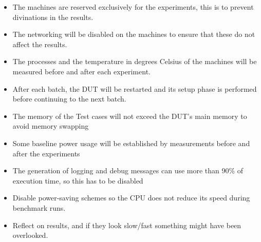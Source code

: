 \begin{itemize}
    \item The machines are reserved exclusively for the experiments, this is to prevent divinations in the results.
    \item The networking will be disabled on the machines to ensure that these do not affect the results.
    \item The processes and the temperature in degrees Celsius of the machines will be measured before and after each experiment.
    \item After each batch, the DUT will be restarted and its setup phase is performed before continuing to the next batch.
    \item The memory of the Test cases will not exceed the DUT's main memory to avoid memory swapping
    \item Some baseline power usage will be established by measurements before and after the experiments
    \item The generation of logging and debug messages can use more than 90\% of execution time, so this has to be disabled
    \item Disable power-saving schemes so the CPU does not reduce its speed during benchmark runs.
    \item Reflect on results, and if they look slow/fast something might have been overlooked.
\end{itemize}

